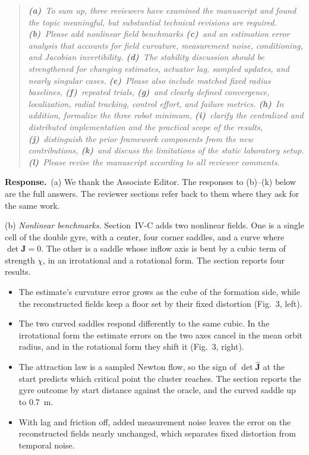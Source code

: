 \documentclass[10pt]{article}
\newcommand{\resp}{\par\textbf{Response.}~}
\begin{document}
\begin{quote}\itshape
\textbf{(a)}~To sum up, three reviewers have examined the manuscript and found the topic meaningful, but substantial technical revisions are required.
\textbf{(b)}~Please add nonlinear field benchmarks
\textbf{(c)}~and an estimation error analysis that accounts for field curvature, measurement noise, conditioning, and Jacobian invertibility.
\textbf{(d)}~The stability discussion should be strengthened for changing estimates, actuator lag, sampled updates, and nearly singular cases.
\textbf{(e)}~Please also include matched fixed radius baselines,
\textbf{(f)}~repeated trials,
\textbf{(g)}~and clearly defined convergence, localization, radial tracking, control effort, and failure metrics.
\textbf{(h)}~In addition, formalize the three robot minimum,
\textbf{(i)}~clarify the centralized and distributed implementation and the practical scope of the results,
\textbf{(j)}~distinguish the prior framework components from the new contributions,
\textbf{(k)}~and discuss the limitations of the static laboratory setup.
\textbf{(l)}~Please revise the manuscript according to all reviewer comments.
\end{quote}


\resp (a) We thank the Associate Editor. The responses to (b)--(k) below are the full answers. The reviewer sections refer back to them where they ask for the same work.

(b) \emph{Nonlinear benchmarks.} Section~IV-C adds two nonlinear fields. One is a single cell of the double gyre, with a center, four corner saddles, and a curve where $\det\mathbf{J} = 0$. The other is a saddle whose inflow axis is bent by a cubic term of strength $\chi$, in an irrotational and a rotational form. The section reports four results.
\begin{itemize}
\item The estimate's curvature error grows as the cube of the formation side, while the reconstructed fields keep a floor set by their fixed distortion (Fig.~3, left).
\item The two curved saddles respond differently to the same cubic. In the irrotational form the estimate errors on the two axes cancel in the mean orbit radius, and in the rotational form they shift it (Fig.~3, right).
\item The attraction law is a sampled Newton flow, so the sign of $\det\hat{\mathbf{J}}$ at the start predicts which critical point the cluster reaches. The section reports the gyre outcome by start distance against the oracle, and the curved saddle up to 0.7~m.
\item With lag and friction off, added measurement noise leaves the error on the reconstructed fields nearly unchanged, which separates fixed distortion from temporal noise.
\end{itemize}
\end{document}
